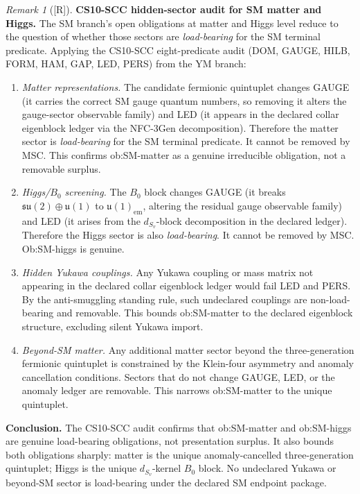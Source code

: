 \documentclass[12pt,oneside]{amsbook}
\theoremstyle{plain}
\theoremstyle{definition}
\theoremstyle{remark}
\newtheorem{remark}[theorem]{Remark}
\newcommand{\status}[1]{\textup{[#1]}}
\begin{document}
\begin{remark}[\status{R}]\label{rem:SM-sector-audit}
\textbf{CS10-SCC hidden-sector audit for SM matter and Higgs.}
The SM branch's open obligations at matter and Higgs level reduce
to the question of whether those sectors are \emph{load-bearing}
for the SM terminal predicate. Applying the CS10-SCC eight-predicate
audit (DOM, GAUGE, HILB, FORM, HAM, GAP, LED, PERS) from the
YM branch:
\begin{enumerate}[label=\textup{(\arabic*)}]
 \item \emph{Matter representations.} The candidate fermionic
 quintuplet changes GAUGE (it carries the correct SM gauge quantum
 numbers, so removing it alters the gauge-sector observable family)
 and LED (it appears in the declared collar eigenblock ledger via
 the NFC-3Gen decomposition). Therefore the matter sector is
 \emph{load-bearing} for the SM terminal predicate. It cannot be
 removed by MSC. This confirms ob:SM-matter as a genuine
 irreducible obligation, not a removable surplus.
 \item \emph{Higgs/$B_0$ screening.} The $B_0$ block changes
 GAUGE (it breaks $\mathfrak{su}(2)\oplus\mathfrak{u}(1)$ to
 $\mathfrak{u}(1)_{\mathrm{em}}$, altering the residual gauge
 observable family) and LED (it arises from the $d_{S_v}$-block
 decomposition in the declared ledger). Therefore the Higgs sector
 is also \emph{load-bearing}. It cannot be removed by MSC.
 Ob:SM-higgs is genuine.
 \item \emph{Hidden Yukawa couplings.} Any Yukawa coupling or mass
 matrix not appearing in the declared collar eigenblock ledger would
 fail LED and PERS. By the anti-smuggling standing rule, such
 undeclared couplings are non-load-bearing and removable.
 This bounds ob:SM-matter to the declared eigenblock structure,
 excluding silent Yukawa import.
 \item \emph{Beyond-SM matter.} Any additional matter sector beyond
 the three-generation fermionic quintuplet is constrained by the
 Klein-four asymmetry and anomaly cancellation conditions. Sectors
 that do not change GAUGE, LED, or the anomaly ledger are removable.
 This narrows ob:SM-matter to the unique quintuplet.
\end{enumerate}
\textbf{Conclusion.} The CS10-SCC audit confirms that ob:SM-matter
and ob:SM-higgs are genuine load-bearing obligations, not
presentation surplus. It also bounds both obligations sharply:
matter is the unique anomaly-cancelled three-generation quintuplet;
Higgs is the unique $d_{S_v}$-kernel $B_0$ block. No undeclared
Yukawa or beyond-SM sector is load-bearing under the declared
SM endpoint package.
\end{remark}
\end{document}
